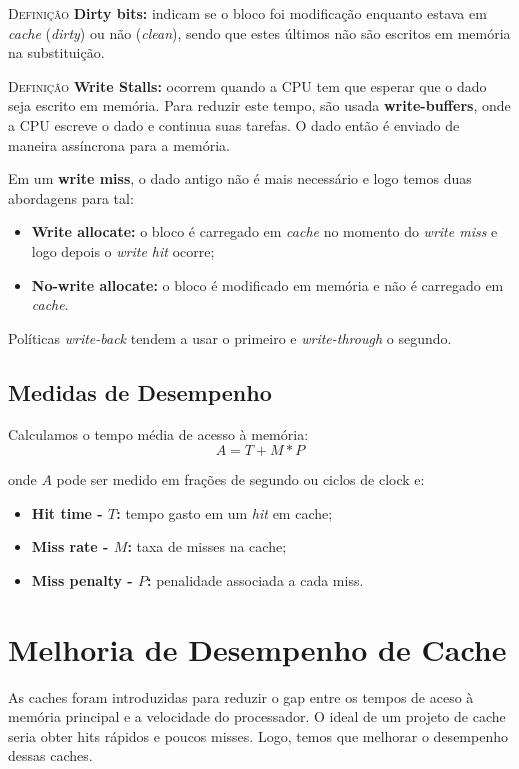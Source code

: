 \textsc{Definição} \textbf{Dirty bits:} indicam se o bloco foi modificação enquanto estava em \textit{cache} (\textit{dirty}) ou não (\textit{clean}), sendo que estes últimos não são escritos em memória na substituição.

\textsc{Definição} \textbf{Write Stalls:} ocorrem quando a CPU tem que esperar que o dado seja escrito em memória. Para reduzir este tempo, são usada \textbf{write-buffers}, onde a CPU escreve o dado e continua suas tarefas. O dado então é enviado de maneira assíncrona para a memória.

Em um \textbf{write miss}, o dado antigo não é mais necessário e logo temos duas abordagens para tal:
\begin{itemize}
  \item \textbf{Write allocate:} o bloco é carregado em \textit{cache} no momento do \textit{write miss} e logo depois o \textit{write hit} ocorre;

  \item \textbf{No-write allocate:} o bloco é modificado em memória e não é carregado em \textit{cache}.
\end{itemize}

Políticas \textit{write-back} tendem a usar o primeiro e \textit{write-through} o segundo.

\subsection{Medidas de Desempenho}
Calculamos o tempo média de acesso à memória:
\begin{equation}
  A = T + M * P
\end{equation}

onde $A$ pode ser medido em frações de segundo ou ciclos de clock e:

\begin{itemize}
  \item \textbf{Hit time - $T$:} tempo gasto em um \textit{hit} em cache;
  \item \textbf{Miss rate - $M$:} taxa de misses na cache;
  \item \textbf{Miss penalty - $P$:} penalidade associada a cada miss.
\end{itemize}






\section{Melhoria de Desempenho de Cache}
As caches foram introduzidas para reduzir o gap entre os tempos de aceso à memória principal e a velocidade do processador. O ideal de um projeto de cache seria obter hits rápidos e poucos misses. Logo, temos que melhorar o desempenho dessas caches.

